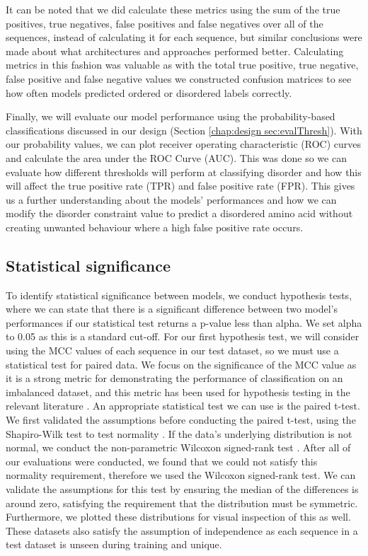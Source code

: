 \documentclass{l4proj}
\begin{document}
It can be noted that we did calculate these metrics using the sum of the true positives, true negatives, false positives and false negatives over all of the sequences, instead of calculating it for each sequence, but similar conclusions were made about what architectures and approaches performed better. Calculating metrics in this fashion was valuable as with the total true positive, true negative, false positive and false negative values we constructed confusion matrices to see how often models predicted ordered or disordered labels correctly.

Finally, we will evaluate our model performance using the probability-based classifications discussed in our design (Section \ref{chap:design sec:evalThresh}). With our probability values, we can plot receiver operating characteristic (ROC) curves and calculate the area under the ROC Curve (AUC). This was done so we can evaluate how different thresholds will perform at classifying disorder and how this will affect the true positive rate (TPR) and false positive rate (FPR). This gives us a further understanding about the models’ performances and how we can modify the disorder constraint value to predict a disordered amino acid without creating unwanted behaviour where a high false positive rate occurs.

\subsection{Statistical significance}

To identify statistical significance between models, we conduct hypothesis tests, where we can state that there is a significant difference between two model’s performances if our statistical test returns a p-value less than alpha. We set alpha to 0.05 as this is a standard cut-off. For our first hypothesis test, we will consider using the MCC values of each sequence in our test dataset, so we must use a statistical test for paired data. We focus on the significance of the MCC value as it is a strong metric for demonstrating the performance of classification on an imbalanced dataset, and this metric has been used for hypothesis testing in the relevant literature \citep{Zhao:22}. An appropriate statistical test we can use is the paired t-test. We first validated the assumptions before conducting the paired t-test, using the Shapiro-Wilk test to test normality \citep{Shapiro:wiki}. If the data’s underlying distribution is not normal, we conduct the non-parametric Wilcoxon signed-rank test \citep{Wilcoxon:wiki}. After all of our evaluations were conducted, we found that we could not satisfy this normality requirement, therefore we used the Wilcoxon signed-rank test. We can validate the assumptions for this test by ensuring the median of the differences is around zero, satisfying the requirement that the distribution must be symmetric. Furthermore, we plotted these distributions for visual inspection of this as well. These datasets also satisfy the assumption of independence as each sequence in a test dataset is unseen during training and unique.
\end{document}
